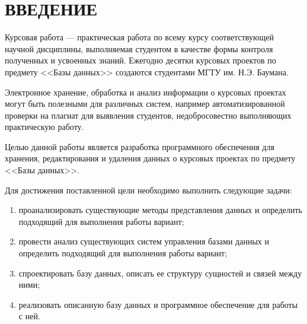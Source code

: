 \newpage
\chapter*{ВВЕДЕНИЕ}

Курсовая работа --- практическая работа\cite{coursework} по всему курсу соответствующей научной дисциплины, выполняемая студентом в качестве формы контроля полученных и усвоенных знаний. Ежегодно десятки курсовых проектов по предмету <<Базы данных>> создаются студентами МГТУ им. Н.Э. Баумана.

Электронное хранение, обработка и анализ информации о курсовых проектах могут быть полезными для различных систем, например автоматизированной проверки на плагиат для выявления студентов, недобросовестно выполняющих практическую работу.


Целью данной работы является разработка программного обеспечения для хранения, редактирования и удаления данных о курсовых проектах по предмету <<Базы данных>>.

Для достижения поставленной цели необходимо выполнить следующие задачи:
\begin{enumerate}
	\item проанализировать существующие методы представления данных и определить подходящий для выполнения работы вариант;
	\item провести анализ существующих систем управления базами данных и определить подходящий для выполнения работы вариант;
	\item спроектировать базу данных, описать ее структуру сущностей и связей между ними;
	\item реализовать описанную базу данных и программное обеспечение для работы с ней.
\end{enumerate}

